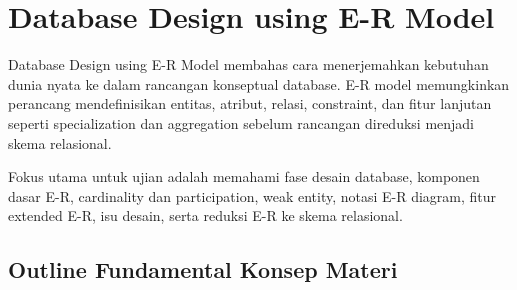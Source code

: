 \section{Database Design using E-R Model}

Database Design using E-R Model membahas cara menerjemahkan kebutuhan dunia nyata ke dalam rancangan konseptual database. E-R model memungkinkan perancang mendefinisikan entitas, atribut, relasi, constraint, dan fitur lanjutan seperti specialization dan aggregation sebelum rancangan direduksi menjadi skema relasional.

Fokus utama untuk ujian adalah memahami fase desain database, komponen dasar E-R, cardinality dan participation, weak entity, notasi E-R diagram, fitur extended E-R, isu desain, serta reduksi E-R ke skema relasional.

\subsection{Outline Fundamental Konsep Materi}

